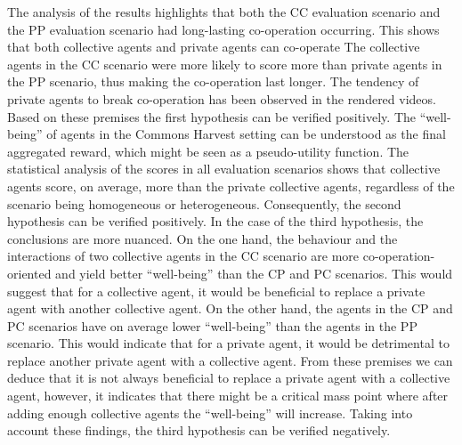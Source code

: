 \documentclass[preprint,12pt,authoryear]{elsarticle}
\begin{document}

The analysis of the results highlights that both the CC evaluation scenario and the PP evaluation scenario had long-lasting co-operation occurring. This shows that both collective agents and private agents can co-operate
The collective agents in the CC scenario were more likely to score more than private agents in the PP scenario, thus making the co-operation last longer. The tendency of private agents to break co-operation has been observed in the rendered videos. Based on these premises the first hypothesis can be verified positively. The “well-being” of agents in the Commons Harvest setting can be understood as the final aggregated reward, which might be seen as a pseudo-utility function. The statistical analysis of the scores in all evaluation scenarios shows that collective agents score, on average, more than the private collective agents, regardless of the scenario being homogeneous or heterogeneous. Consequently, the second hypothesis can be verified positively. In the case of the third hypothesis, the conclusions are more nuanced. On the one hand, the behaviour and the interactions of two collective agents in the CC scenario are more co-operation-oriented and yield better “well-being” than the CP and PC scenarios. This would suggest that for a collective agent, it would be beneficial to replace a private agent with another collective agent. On the other hand, the agents in the CP and PC scenarios have on average lower “well-being” than the agents in the PP scenario. This would indicate that for a private agent, it would be detrimental to replace another private agent with a collective agent. From these premises we can deduce that it is not always beneficial to replace a private agent with a collective agent, however, it indicates that there might be a critical mass point where after adding enough collective agents the “well-being” will increase. Taking into account these findings, the third hypothesis can be verified negatively.
\end{document}
